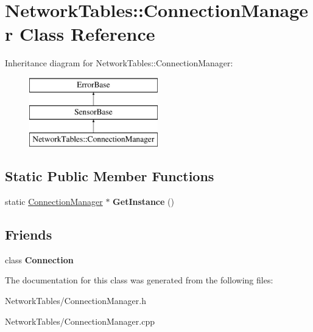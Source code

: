 \hypertarget{classNetworkTables_1_1ConnectionManager}{
\section{NetworkTables::ConnectionManager Class Reference}
\label{classNetworkTables_1_1ConnectionManager}
}
Inheritance diagram for NetworkTables::ConnectionManager:\begin{figure}[H]
\begin{center}
\leavevmode
\includegraphics[height=3.000000cm]{classNetworkTables_1_1ConnectionManager}
\end{center}
\end{figure}
\subsection*{Static Public Member Functions}
\begin{DoxyCompactItemize}
\item 
\hypertarget{classNetworkTables_1_1ConnectionManager_a0a735ec704148b81d8a32a8fd832d5a9}{
static \hyperlink{classNetworkTables_1_1ConnectionManager}{ConnectionManager} $\ast$ {\bfseries GetInstance} ()}
\label{classNetworkTables_1_1ConnectionManager_a0a735ec704148b81d8a32a8fd832d5a9}

\end{DoxyCompactItemize}
\subsection*{Friends}
\begin{DoxyCompactItemize}
\item 
\hypertarget{classNetworkTables_1_1ConnectionManager_a54a11fdc71e1679a42fa0c0e3856673d}{
class {\bfseries Connection}}
\label{classNetworkTables_1_1ConnectionManager_a54a11fdc71e1679a42fa0c0e3856673d}

\end{DoxyCompactItemize}


The documentation for this class was generated from the following files:\begin{DoxyCompactItemize}
\item 
NetworkTables/ConnectionManager.h\item 
NetworkTables/ConnectionManager.cpp\end{DoxyCompactItemize}
